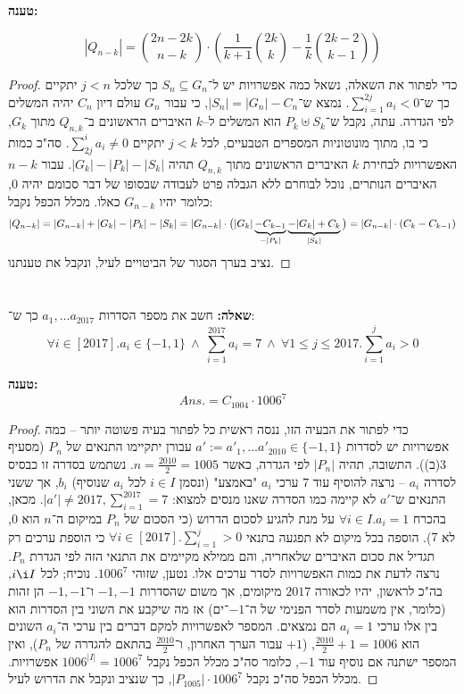 \documentclass[]{article}
\newcommand\ans   {\mathit{Ans.}}
\newcommand\cl [1]    {\left ( #1 \right )}
\begin{document}
\begin{enumerate}[(A)]
		\textbf{טענה: }
		
		\[ |Q_{n - k}| = \binom{2n - 2k}{n - k} \cdot \cl{\frac{1}{k + 1}\binom{2k}{k} - \frac{1}{k}\binom{2k-2}{k-1}} \]
		
		\begin{proof}
			כדי לפתור את השאלה, נשאל כמה אפשרויות יש ל־$S_n \subseteq G_n$ כך שלכל $j < n$ יתקיים כך ש־$\sum_{i = 1}^{2j} a_i < 0$. נמצא ש־$|S_n| = |G_n| - C_n$, כי עבור $G_n$ עולם דיון $C_n$ יהיה המשלים לפי הגדרה. עתה, נקבל ש־$P_k \uplus S_k$ הוא המשלים ל–$k$ האיברים הראשונים ב־$Q_{n, k}$ מתוך $G_k$, כי בו, מתוך מונוטוניות המספרים הטבעיים, לכל $j < k$ יתקיים $\sum_{2j}^{i} a_i \neq 0$. סה"כ כמות האפשרויות לבחירת $k$ האיברים הראשונים מתוך $Q_{n, k}$ תהיה $|G_k| - |P_k| - |S_k|$. עבור $n - k$ האיברים הנותרים, נוכל לבוחרם ללא הגבלה פרט לעבודה שבסופו של דבר סכומם יהיה $0$, כלומר יהיו $G_{n - k}$ כאלו. מכלל הכפל נקבל: 
			\[ |Q_{n - k}| = |G_{n - k}| + |G_k| - |P_k| - |S_k| = |G_{n - k}| \cdot \big( |G_k| \underbrace{- C_{k - 1}}_{\mathclap{-|P_k|}} \underbrace{- |G_k| + C_k}_{\mathclap{|S_k|}}\big) = |G_{n - k}| \cdot (C_k - C_{k - 1}) \]
			נציב בערך הסגור של הביטויים לעיל, ונקבל את טענתנו. 
		\end{proof}
	\end{enumerate}
	
	\section{} %
	\textbf{שאלה: }חשב את מספר הסדרות $a_1, \dots a_{2017}$  כך ש־: 
	\[ \forall i \in [2017]. a_i \in \{-1, 1\} \ \land \ \sum_{i = 1}^{2017} a_i = 7 \ \land \ \forall 1 \le j \le 2017. \sum_{i = 1}^{j}a_i > 0 \]
	
	\textbf{טענה: }
	\[ \ans = C_{1004} \cdot 1006^{7} \]
	
	\begin{proof}
		כדי לפתור את הבעיה הזו, ננסה ראשית כל לפתור בעיה פשוטה יותר – כמה אפשרויות יש לסדרות 	$a' := a'_1, \dots a'_{2010} \in \{-1, 1\}$ עבורן יתקיימו התנאים של $P_n$ (מסעיף 3(ב)). התשובה, תהיה $|P_n|$ לפי הגדרה, כאשר $n = \frac{2010}{2} = 1005$. נשתמש בסדרה זו כבסיס לסדרה $a_i$ – נרצה להוסיף עוד $7$ ערכי $a_i$ "באמצע" (ונסמן $i \in I$ לכל $a_i$ שנוסיף) $b_i$, אך ששני התנאים ש־$a'$ לא קיימה כמו הסדרה שאנו מנסים למצוא: $|a'| \neq 2017, \sum_{i = 1}^{2017} = 7$. מכאן, בהכרח $\forall i \in I. a_i = 1$ על מנת להגיע לסכום הדרוש (כי הסכום של $P_n$ במיקום ה־$n$ הוא $0$, לא $7$). הוספה בכל מיקום לא תפגעה בתנאי $\forall i \in [2017]. \sum_{i = 1}^{j} > 0$ כי הוספת ערכים רק תגדיל את סכום האיברים שלאחריה, והם ממילא מקיימים את התנאי הזה לפי הגדרת $P_n$. נרצה לדעת את כמות האפשרויות לסדר ערכים אלו. נטען, שזוהי $1006^{7}$. נוכיח; לכל $i \i I$, בה"כ לראשון, יהיו לכאורה $2017$ מיקומים, אך משום שהסדרות $-1, -1$ ו־$-1, -1$ הן זהות (כלומר, אין משמעות לסדר הפנימי של ה־$-1$־ים) אז מה שיקבע את השוני בין הסדרות הוא בין אלו ערכי $a_i = 1$ הם נמצאים. המספר לאפשרויות למקם דברים בין ערכי ה־$a_i$ השונים הוא $\frac{2010}{2} + 1 = 1006$, ($+1$ עבור הערך האחרון, ו־$\frac{2010}{2}$ בהתאם להגדרה של $P_n$), ואין המספר ישתנה אם נוסיף עוד $-1$, כלומר סה"כ מכלל הכפל נקבל $1006^{|I|} = 1006^{7}$ אפשרויות. מכלל הכפל סה"כ נקבל $|P_{1005}| \cdot 1006^{7}$, כך שנציב ונקבל את הדרוש לעיל. 
	\end{proof}
	
\end{document}
